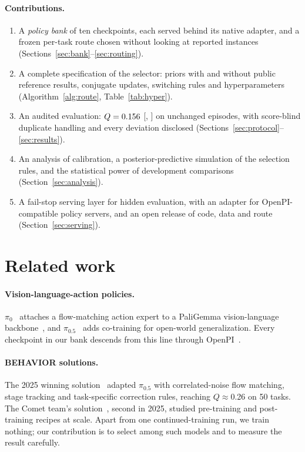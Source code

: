 \documentclass[10pt]{article}
\newcommand{\Q}{\ensuremath{Q}}
\begin{document}
\paragraph{Contributions.}
\begin{enumerate}
\item A \emph{policy bank} of ten checkpoints, each served behind its native adapter, and a frozen per-task route chosen without looking at reported instances (Sections~\ref{sec:bank}--\ref{sec:routing}).
\item A complete specification of the selector: priors with and without public reference results, conjugate updates, switching rules and hyperparameters (Algorithm~\ref{alg:route}, Table~\ref{tab:hyper}).
\item An audited evaluation: $\Q=\Qval$ [\Qlo, \Qhi] on \Nepisodes{} unchanged episodes, with score-blind duplicate handling and every deviation disclosed (Sections~\ref{sec:protocol}--\ref{sec:results}).
\item An analysis of calibration, a posterior-predictive simulation of the selection rules, and the statistical power of development comparisons (Section~\ref{sec:analysis}).
\item A fail-stop serving layer for hidden evaluation, with an adapter for OpenPI-compatible policy servers, and an open release of code, data and route (Section~\ref{sec:serving}).
\end{enumerate}

\section{Related work}

\paragraph{Vision-language-action policies.} $\pi_0$~\cite{black2024pi0} attaches a flow-matching action expert to a PaliGemma vision-language backbone~\cite{beyer2024paligemma}, and $\pi_{0.5}$~\cite{pi05} adds co-training for open-world generalization. Every checkpoint in our bank descends from this line through OpenPI~\cite{openpi}.

\paragraph{BEHAVIOR solutions.} The 2025 winning solution~\cite{larchenko2025task} adapted $\pi_{0.5}$ with correlated-noise flow matching, stage tracking and task-specific correction rules, reaching \Q{}$\approx$0.26 on 50 tasks. The Comet team's solution~\cite{bai2025comet}, second in 2025, studied pre-training and post-training recipes at scale. Apart from one continued-training run, we train nothing; our contribution is to select among such models and to measure the result carefully.
\end{document}
